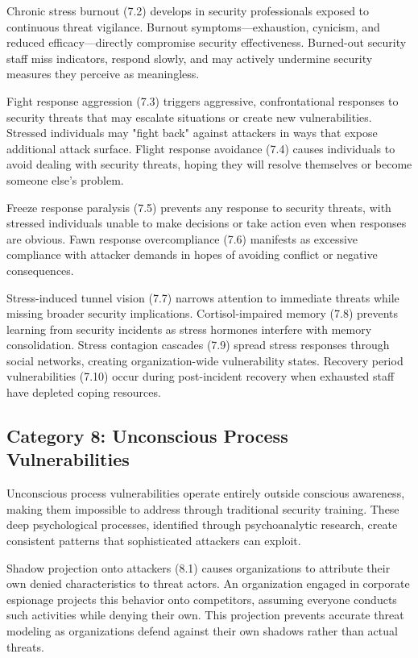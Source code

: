 \documentclass[11pt,a4paper]{article}
\begin{document}
Chronic stress burnout (7.2) develops in security professionals exposed to continuous threat vigilance. Burnout symptoms—exhaustion, cynicism, and reduced efficacy—directly compromise security effectiveness. Burned-out security staff miss indicators, respond slowly, and may actively undermine security measures they perceive as meaningless.

Fight response aggression (7.3) triggers aggressive, confrontational responses to security threats that may escalate situations or create new vulnerabilities. Stressed individuals may "fight back" against attackers in ways that expose additional attack surface. Flight response avoidance (7.4) causes individuals to avoid dealing with security threats, hoping they will resolve themselves or become someone else's problem.

Freeze response paralysis (7.5) prevents any response to security threats, with stressed individuals unable to make decisions or take action even when responses are obvious. Fawn response overcompliance (7.6) manifests as excessive compliance with attacker demands in hopes of avoiding conflict or negative consequences.

Stress-induced tunnel vision (7.7) narrows attention to immediate threats while missing broader security implications. Cortisol-impaired memory (7.8) prevents learning from security incidents as stress hormones interfere with memory consolidation. Stress contagion cascades (7.9) spread stress responses through social networks, creating organization-wide vulnerability states. Recovery period vulnerabilities (7.10) occur during post-incident recovery when exhausted staff have depleted coping resources.

\subsection{Category 8: Unconscious Process Vulnerabilities}

Unconscious process vulnerabilities operate entirely outside conscious awareness, making them impossible to address through traditional security training. These deep psychological processes, identified through psychoanalytic research, create consistent patterns that sophisticated attackers can exploit.

Shadow projection onto attackers (8.1) causes organizations to attribute their own denied characteristics to threat actors. An organization engaged in corporate espionage projects this behavior onto competitors, assuming everyone conducts such activities while denying their own. This projection prevents accurate threat modeling as organizations defend against their own shadows rather than actual threats.
\end{document}
